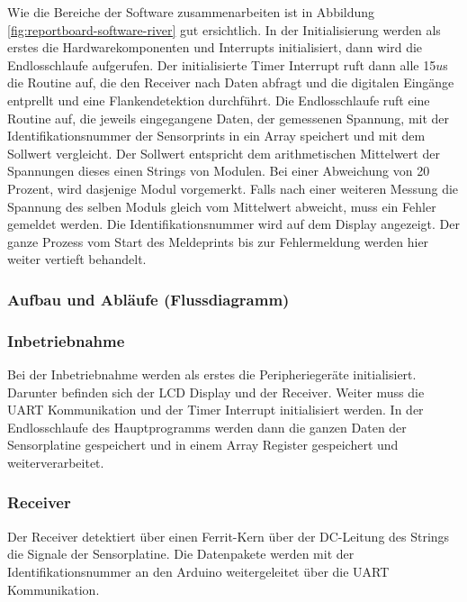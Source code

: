 Wie die Bereiche der Software zusammenarbeiten ist in Abbildung \ref{fig:reportboard-software-river} gut ersichtlich. In der Initialisierung werden als erstes die Hardwarekomponenten und Interrupts initialisiert, dann wird die Endlosschlaufe aufgerufen.
\newline
Der initialisierte Timer Interrupt ruft dann alle 15$u$s die Routine auf, die den Receiver nach Daten abfragt und die digitalen Eingänge entprellt und eine Flankendetektion durchführt.
\newline
Die Endlosschlaufe ruft eine Routine auf, die jeweils eingegangene Daten, der gemessenen Spannung, mit der Identifikationsnummer der Sensorprints in ein Array speichert und mit dem Sollwert vergleicht. Der Sollwert entspricht dem arithmetischen Mittelwert der Spannungen dieses einen Strings von Modulen. Bei einer Abweichung von 20 Prozent, wird dasjenige Modul vorgemerkt. Falls nach einer weiteren Messung die Spannung des selben Moduls gleich vom Mittelwert abweicht, muss ein Fehler gemeldet werden. Die Identifikationsnummer wird auf dem Display angezeigt. Der ganze Prozess vom Start des Meldeprints bis zur Fehlermeldung werden hier weiter vertieft behandelt.

\subsubsection{Aufbau und Abläufe (Flussdiagramm)}
\subsubsection{Inbetriebnahme}
Bei der Inbetriebnahme werden als erstes die Peripheriegeräte initialisiert. Darunter befinden sich der LCD Display und der Receiver. Weiter muss die UART Kommunikation und der Timer Interrupt initialisiert werden. In der Endlosschlaufe des Hauptprogramms werden dann die ganzen Daten der Sensorplatine gespeichert und in einem Array Register gespeichert und weiterverarbeitet.

\subsubsection{Receiver}
Der Receiver detektiert über einen Ferrit-Kern über der DC-Leitung des Strings die Signale der Sensorplatine. Die Datenpakete werden mit der Identifikationsnummer an den Arduino weitergeleitet über die UART Kommunikation.


